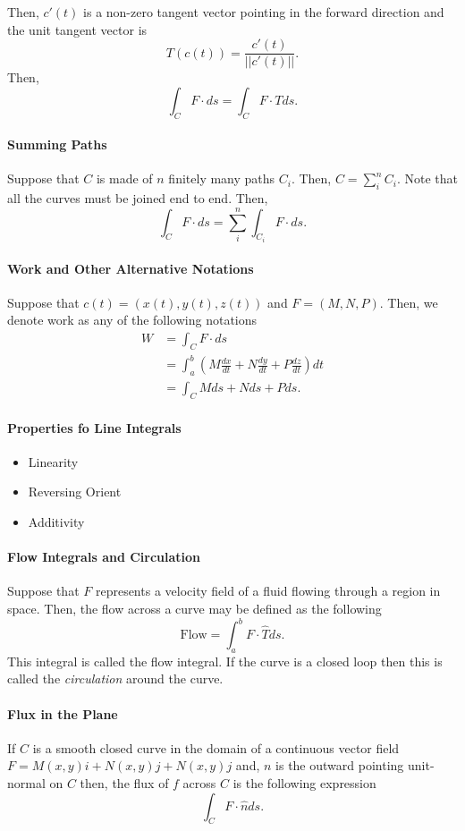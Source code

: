 Then, \(c'(t)\) is a non-zero tangent vector pointing in the forward direction and the unit tangent vector is 
\[T(c(t)) = \frac{c'(t)}{||c'(t)||}.\]
Then,
\[
    \int_C F\cdot ds = \int_C F \cdot T ds.
\]

\paragraph{Summing Paths}
Suppose that \(C\) is made of \(n\) finitely many paths \(C_i\).
Then, \(C = \sum_{i}^n C_i\).
Note that all the curves must be joined end to end.
Then,
\[\int_C F \cdot ds = \sum_{i}^n \int_{C_i} F \cdot ds.\]

\paragraph{Work and Other Alternative Notations}
Suppose that \(c(t) = (x(t), y(t), z(t))\) and
\(F = (M, N, P)\).
Then, we denote work as any of the following notations
\begin{align*}
    W
    &= \int_C F\cdot ds \\
    &= \int_a^b \left(
        M \frac{dx}{dt} + N \frac{dy}{dt} + P \frac{dz}{dt}
    \right) dt \\
    &= \int_C M ds + N ds + P ds.
\end{align*}

\paragraph{Properties fo Line Integrals}
\begin{itemize}
    \item Linearity
    \item Reversing Orient
\item Additivity
\end{itemize}

\paragraph{Flow Integrals and Circulation}
Suppose that \(F\) represents a velocity field of a fluid flowing
through a region in space. Then, the flow across a curve may be
defined as the following
\[
\text{Flow} = \int_a^b F\cdot \hat{T}ds.
\]
This integral is called the flow integral. If the curve is a closed
loop then this is called the \textit{circulation} around the curve.

\paragraph{Flux in the Plane}
If \(C\) is a smooth closed curve in the domain of a continuous vector field
\(F = M(x, y)i + N(x, y)j + N(x, y)j\)
and, \(n\) is the outward pointing unit-normal on \(C\) then, the flux
of \(f\) across \(C\) is the following expression
\[\int_C F\cdot \hat{n} ds.\]

